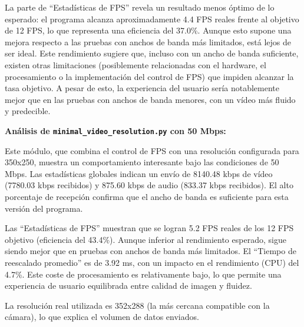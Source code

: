 La parte de ``Estadísticas de FPS'' revela un resultado menos óptimo de lo esperado: el programa alcanza aproximadamente 4.4 FPS reales frente al objetivo de 12 FPS, lo que representa una eficiencia del 37.0\%. Aunque esto supone una mejora respecto a las pruebas con anchos de banda más limitados, está lejos de ser ideal. Este rendimiento sugiere que, incluso con un ancho de banda suficiente, existen otras limitaciones (posiblemente relacionadas con el hardware, el procesamiento o la implementación del control de FPS) que impiden alcanzar la tasa objetivo. A pesar de esto, la experiencia del usuario sería notablemente mejor que en las pruebas con anchos de banda menores, con un vídeo más fluido y predecible.

\vspace{\baselineskip}

\textbf{Análisis de \texttt{minimal\_video\_resolution.py} con 50 Mbps:}
\vspace{\baselineskip}

Este módulo, que combina el control de FPS con una resolución configurada para 350x250, muestra un comportamiento interesante bajo las condiciones de 50 Mbps. Las estadísticas globales indican un envío de 8140.48 kbps de vídeo (7780.03 kbps recibidos) y 875.60 kbps de audio (833.37 kbps recibidos). El alto porcentaje de recepción confirma que el ancho de banda es suficiente para esta versión del programa.

Las ``Estadísticas de FPS'' muestran que se logran 5.2 FPS reales de los 12 FPS objetivo (eficiencia del 43.4\%). Aunque inferior al rendimiento esperado, sigue siendo mejor que en pruebas con anchos de banda más limitados. El ``Tiempo de reescalado promedio'' es de 3.92 ms, con un impacto en el rendimiento (CPU) del 4.7\%. Este coste de procesamiento es relativamente bajo, lo que permite una experiencia de usuario equilibrada entre calidad de imagen y fluidez.

La resolución real utilizada es 352x288 (la más cercana compatible con la cámara), lo que explica el volumen de datos enviados.

\vspace{\baselineskip}


